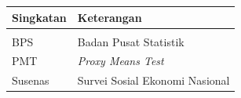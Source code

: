 \begin{singlespace}
\noindent\begin{tabularx}{\textwidth}{@{}p{3cm}X@{}}
\textbf{Singkatan} & \textbf{Keterangan} \\[2pt]
\hline \\[-8pt]
BPS    & Badan Pusat Statistik \\
PMT    & \emph{Proxy Means Test} \\
Susenas & Survei Sosial Ekonomi Nasional \\
\end{tabularx}
\end{singlespace}
